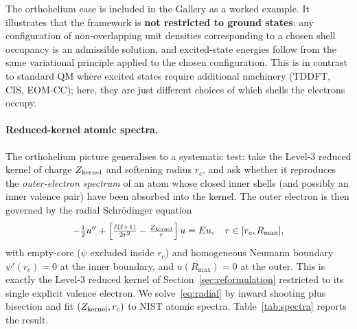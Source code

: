 \documentclass[11pt]{article}
\begin{document}
The orthohelium case is included in the Gallery as a worked example. It illustrates that the framework is \textbf{not restricted to ground states}: any configuration of non-overlapping unit densities corresponding to a chosen shell occupancy is an admissible solution, and excited-state energies follow from the same variational principle applied to the chosen configuration. This is in contrast to standard QM where excited states require additional machinery (TDDFT, CIS, EOM-CC); here, they are just different choices of which shells the electrons occupy.

\paragraph{Reduced-kernel atomic spectra.}
The orthohelium picture generalises to a systematic test: take the Level-3 reduced kernel of charge $Z_{\rm kernel}$ and softening radius $r_c$, and ask whether it reproduces the \emph{outer-electron spectrum} of an atom whose closed inner shells (and possibly an inner valence pair) have been absorbed into the kernel. The outer electron is then governed by the radial Schr\"odinger equation
\begin{equation}
-\tfrac{1}{2} u'' + \left[ \tfrac{\ell(\ell+1)}{2 r^2} - \tfrac{Z_{\rm kernel}}{r} \right] u = E u, \quad r \in [r_c, R_{\max}],
\label{eq:radial}
\end{equation}
with empty-core ($\psi$ excluded inside $r_c$) and homogeneous Neumann boundary $\psi'(r_c) = 0$ at the inner boundary, and $u(R_{\max}) = 0$ at the outer. This is exactly the Level-3 reduced kernel of Section~\ref{sec:reformulation} restricted to its single explicit valence electron. We solve~\eqref{eq:radial} by inward shooting plus bisection and fit $(Z_{\rm kernel}, r_c)$ to NIST atomic spectra. Table~\ref{tab:spectra} reports the result.
\end{document}

